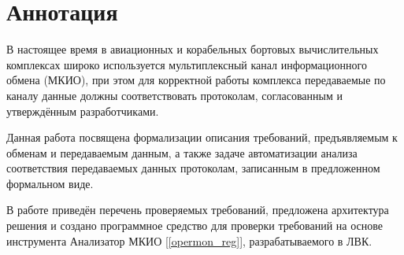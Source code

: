 \section*{Аннотация}

В настоящее время в авиационных и корабельных бортовых вычислительных 
комплексах широко используется мультиплексный канал информационного обмена 
(МКИО), при этом для корректной работы комплекса передаваемые по каналу данные 
должны соответствовать протоколам, согласованным и утверждённым разработчиками.

Данная работа посвящена формализации описания требований, предъявляемым 
к обменам и передаваемым данным, а также задаче автоматизации анализа 
соответствия передаваемых данных протоколам, записанным в предложенном 
формальном виде.

В работе приведён перечень проверяемых требований, предложена архитектура 
решения и создано программное средство для проверки требований на основе 
инструмента Анализатор МКИО [\ref{opermon_reg}], разрабатываемого в 
ЛВК.